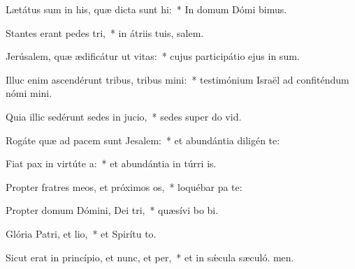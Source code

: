 \item Lætátus sum in his, quæ dicta sunt hi:~* In domum Dómi bimus.
\item Stantes erant pedes tri,~* in átriis tuis, salem.
\item Jerúsalem, quæ ædificátur ut vitas:~* cujus participátio ejus in sum.
\item Illuc enim ascendérunt tribus, tribus mini:~* testimónium Israël ad confiténdum nómi mini.
\item Quia illic sedérunt sedes in jucio,~* sedes super do vid.
\item Rogáte quæ ad pacem sunt Jesalem:~* et abundántia diligén te:
\item Fiat pax in virtúte a:~* et abundántia in túrri is.
\item Propter fratres meos, et próximos os,~* loquébar pa  te:
\item Propter domum Dómini, Dei tri,~* quæsívi bo bi.
\item Glória Patri, et lio,~* et Spirítu to.
\item Sicut erat in princípio, et nunc, et per,~* et in sǽcula sæculó. men.

